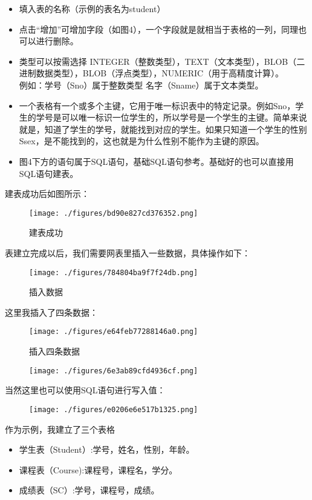 \begin{itemize}
\item 填入表的名称（示例的表名为student）
\item 点击“增加”可增加字段（如图4），一个字段就是就相当于表格的一列，同理也可以进行删除。
\item 类型可以按需选择 INTEGER（整数类型），TEXT（文本类型），BLOB（二进制数据类型），BLOB（浮点类型），NUMERIC（用于高精度计算）。
\\例如：学号（Sno）属于整数类型  名字（Sname）属于文本类型。
\item 一个表格有一个或多个主键，它用于唯一标识表中的特定记录。例如Sno，学生的学号是可以唯一标识一位学生的，所以学号是一个学生的主键。简单来说就是，知道了学生的学号，就能找到对应的学生。如果只知道一个学生的性别Ssex，是不能找到的，这也就是为什么性别不能作为主键的原因。
\item 图4下方的语句属于SQL语句，基础SQL语句参考。基础好的也可以直接用SQL语句建表。
\end{itemize}

建表成功后如图所示：
\begin{figure}[ht]
\centering
\texttt{[image: ./figures/bd90e827cd376352.png]}
\caption{建表成功} \label{fig_SQLint_4}
\end{figure}

表建立完成以后，我们需要网表里插入一些数据，具体操作如下：
\begin{figure}[ht]
\centering
\texttt{[image: ./figures/784804ba9f7f24db.png]}
\caption{插入数据} \label{fig_SQLint_6}
\end{figure}
这里我插入了四条数据：
\begin{figure}[ht]
\centering
\texttt{[image: ./figures/e64feb77288146a0.png]}
\caption{插入四条数据} \label{fig_SQLint_7}
\end{figure}

\begin{figure}[ht]
\centering
\texttt{[image: ./figures/6e3ab89cfd4936cf.png]}
\caption{} \label{fig_SQLint_8}
\end{figure}
当然这里也可以使用SQL语句进行写入值：
\begin{figure}[ht]
\centering
\texttt{[image: ./figures/e0206e6e517b1325.png]}
\caption{} \label{fig_SQLint_9}
\end{figure}
作为示例，我建立了三个表格
\begin{itemize}
\item 学生表（Student）:学号，姓名，性别，年龄。
\item 课程表（Course):课程号，课程名，学分。
\item 成绩表（SC）:学号，课程号，成绩。
\end{itemize}

